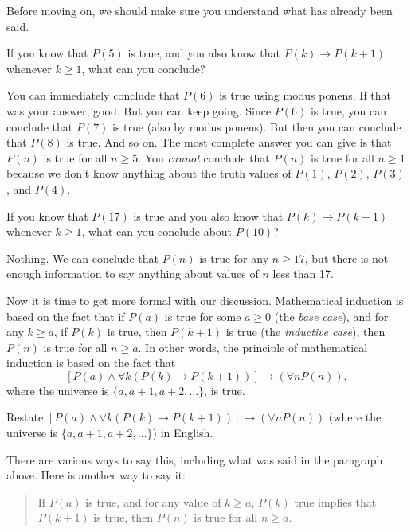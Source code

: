 Before moving on, we should make sure you understand
what has already been said.

\begin{ques}
If you know that $P(5)$ is true, and you also know that
$P(k)\rightarrow P(k+1)$ whenever $k\geq 1$,
what can you conclude?

\answerline
\begin{answer}
You can immediately conclude that $P(6)$ is true using
modus ponens.  If that was your answer, good.
But you can keep going.  Since $P(6)$ is true,
you can conclude that $P(7)$ is true (also by modus ponens).
But then you can conclude that $P(8)$ is true.  
And so on.  The most complete answer you can give is that
$P(n)$ is true for all $n\geq 5$.
You {\em cannot} conclude that $P(n)$ is true for
all $n\geq 1$ because we don't know anything about
the truth values of $P(1)$, $P(2)$, $P(3)$, and $P(4)$.
\end{answer}
\end{ques}

\begin{ques}
If you know that $P(17)$ is true and you also know that
$P(k)\rightarrow P(k+1)$ whenever $k\geq 1$, what can you conclude
about $P(10)$?

\answerline
\begin{answer}
Nothing. We can conclude that $P(n)$ is true for any $n\geq 17$,
but there is not enough information to say anything about values of $n$
less than 17.
\end{answer}
\end{ques}

Now it is time to get more formal with our discussion.
Mathematical induction is based on the fact that
if $P(a)$ is true for some $a\geq 0$ (the {\em base case}), 
and for any $k\geq a$, if $P(k)$ is true, then $P(k+1)$ is true
(the {\em inductive case}),
then $P(n)$ is true for all $n\geq a$. 
In other words, the principle of mathematical induction is based on the
fact that 
$$[P(a)\wedge\forall k(P(k)\rightarrow P(k+1))]\rightarrow (\forall n P(n)),$$
where the universe is $\{a,a+1,a+2,\ldots\}$, is true.

\begin{exer}
Restate $[P(a)\wedge\forall k(P(k)\rightarrow P(k+1))]\rightarrow (\forall n P(n))$ 
(where the universe is $\{a,a+1,a+2,\ldots\}$) in English.

\noindent
\answerlinethree
\begin{answer}
There are various ways to say this, including what was said in the paragraph above.
Here is another way to say it:
\begin{quote}
If $P(a)$ is true, and for any value of $k\geq a$,
$P(k)$ true implies that $P(k+1)$ is true, then $P(n)$ is true for all $n\geq a$.
\end{quote}
\end{answer}
\end{exer}

